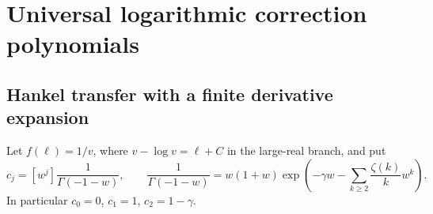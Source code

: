 \documentclass[11pt]{article}
\numberwithin{equation}{section}
\theoremstyle{remark}\newtheorem{remark}[theorem]{Remark}
\begin{document}
\section{Universal logarithmic correction polynomials}\label{peo:sec:logs}
\subsection{Hankel transfer with a finite derivative expansion}
Let $f(\ell)=1/v$, where $v-\log v=\ell+C$ in the large-real branch, and put
\begin{equation}
 c_j=[w^j]\frac1{\Gamma(-1-w)},\qquad
 \frac1{\Gamma(-1-w)}=w(1+w)
 \exp\!\left(-\gamma w-\sum_{k\ge2}\frac{\zeta(k)}k w^k\right).
 \label{peo:eq:Gamma}
\end{equation}
In particular $c_0=0$, $c_1=1$, $c_2=1-\gamma$.
\end{document}
